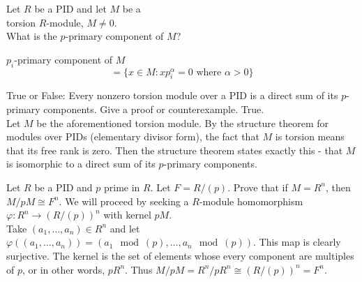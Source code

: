\documentclass[avery5371,grid]{flashcards}
\let \phi \varphi
\begin{document}
\begin{flashcard}[Modules]{Let $R$ be a PID and let $M$ be a \\torsion $R$-module, $M \neq 0$. \\What is the $p$-primary component of $M$?}

$p_i$-primary component of $M$
$$=\{x\in M: xp_i^\alpha=0\text{ where }\alpha>0\}$$
 
\end{flashcard}

\begin{flashcard}[Modules]{True or False: Every nonzero torsion module over a PID is a direct sum of its $p$-primary components. Give a proof or counterexample.}
 True. \\
 
 Let $M$ be the aforementioned torsion module. By the structure theorem for modules over PIDs (elementary divisor form), the fact that $M$ is torsion means that its free rank is zero. Then the structure theorem states exactly this - that $M$ is isomorphic to a direct sum of its $p$-primary components.
\end{flashcard}

\begin{flashcard}[Modules]{Let $R$ be a PID and $p$ prime in $R$. Let $F = R/(p)$. Prove that if $M = R^n$, then $M/pM \cong F^n$.}
 We will proceed by seeking a $R$-module homomorphism $\phi: R^n \to (R/(p))^n$ with kernel $pM$.\\
 
 Take $(a_1, \ldots, a_n) \in R^n$ and let $\phi((a_1, \ldots, a_n)) = (a_1 \mod (p), \ldots, a_n \mod (p))$. This map is clearly surjective. The kernel is the set of elements whose every component are multiples of $p$, or in other words, $pR^n$. Thus $M / pM = R^n / p R^n \cong (R/(p))^n = F^n$.
\end{flashcard}
\end{document}
